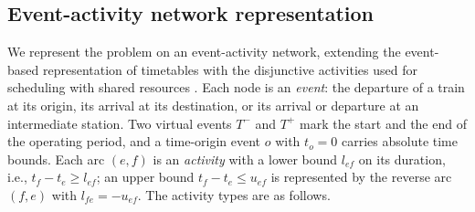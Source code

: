 \subsection{Event-activity network representation}\label{sec:ean}
We represent the problem on an event-activity network, extending the event-based representation of timetables \citep{Serafini1989,Liebchen2007} with the disjunctive activities used for scheduling with shared resources \citep{Bartusch1988,Mascis2002}. Each node is an \emph{event}: the departure of a train at its origin, its arrival at its destination, or its arrival or departure at an intermediate station. Two virtual events $T^-$ and $T^+$ mark the start and the end of the operating period, and a time-origin event $o$ with $t_o=0$ carries absolute time bounds. Each arc $(e,f)$ is an \emph{activity} with a lower bound $l_{ef}$ on its duration, i.e., $t_f-t_e\ge l_{ef}$; an upper bound $t_f-t_e\le u_{ef}$ is represented by the reverse arc $(f,e)$ with $l_{fe}=-u_{ef}$. The activity types are as follows.
